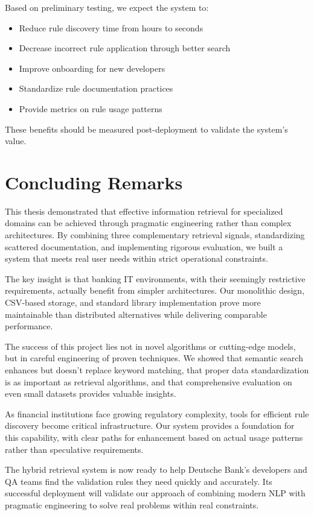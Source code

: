 Based on preliminary testing, we expect the system to:

\begin{itemize}[leftmargin=*,itemsep=2pt,topsep=2pt]
  \item Reduce rule discovery time from hours to seconds
  \item Decrease incorrect rule application through better search
  \item Improve onboarding for new developers
  \item Standardize rule documentation practices
  \item Provide metrics on rule usage patterns
\end{itemize}

These benefits should be measured post-deployment to validate the system's value.

\section{Concluding Remarks}

This thesis demonstrated that effective information retrieval for specialized domains can be achieved through pragmatic engineering rather than complex architectures. By combining three complementary retrieval signals, standardizing scattered documentation, and implementing rigorous evaluation, we built a system that meets real user needs within strict operational constraints.

The key insight is that banking IT environments, with their seemingly restrictive requirements, actually benefit from simpler architectures. Our monolithic design, CSV-based storage, and standard library implementation prove more maintainable than distributed alternatives while delivering comparable performance.

The success of this project lies not in novel algorithms or cutting-edge models, but in careful engineering of proven techniques. We showed that semantic search enhances but doesn't replace keyword matching, that proper data standardization is as important as retrieval algorithms, and that comprehensive evaluation on even small datasets provides valuable insights.

As financial institutions face growing regulatory complexity, tools for efficient rule discovery become critical infrastructure. Our system provides a foundation for this capability, with clear paths for enhancement based on actual usage patterns rather than speculative requirements.

The hybrid retrieval system is now ready to help Deutsche Bank's developers and QA teams find the validation rules they need quickly and accurately. Its successful deployment will validate our approach of combining modern NLP with pragmatic engineering to solve real problems within real constraints.
